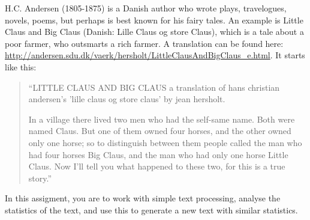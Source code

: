 H.C. Andersen (1805-1875) is a Danish author who wrote plays, travelogues, novels, poems, but perhaps is best known for his fairy tales. An example is Little Claus and Big Claus (Danish: Lille Claus og store Claus), which is a tale about a poor farmer, who outsmarts a rich farmer. A translation can be found here: \url{http://andersen.sdu.dk/vaerk/hersholt/LittleClausAndBigClaus_e.html}. It starts like this:
\begin{quote}
  ``LITTLE CLAUS AND BIG CLAUS
a translation of hans christian andersen's 'lille claus og store claus' by jean hersholt.

In a village there lived two men who had the self-same name. Both were named Claus. But one of them owned four horses, and the other owned only one horse; so to distinguish between them people called the man who had four horses Big Claus, and the man who had only one horse Little Claus. Now I'll tell you what happened to these two, for this is a true story.''
\end{quote}

In this assigment, you are to work with simple text processing, analyse the statistics of the text, and use this to generate a new text with similar statistics.